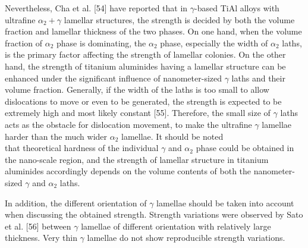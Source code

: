 \documentclass[10pt]{article}
\begin{document}
Nevertheless, Cha et al. [54] have reported that in $\gamma$-based TiAl alloys with ultrafine $\alpha_{2}+\gamma$ lamellar structures, the strength is decided by both the volume fraction and lamellar thickness of the two phases. On one hand, when the volume fraction of $\alpha_{2}$ phase is dominating, the $\alpha_{2}$ phase, especially the width of $\alpha_{2}$ laths, is the primary factor affecting the strength of lamellar colonies. On the other hand, the strength of titanium aluminides having a lamellar structure can be enhanced under the significant influence of nanometer-sized $\gamma$ laths and their volume fraction. Generally, if the width of the laths is too small to allow dislocations to move or even to be generated, the strength is expected to be extremely high and most likely constant [55]. Therefore, the small size of $\gamma$ laths acts as the obstacle for dislocation movement, to make the ultrafine $\gamma$ lamellae harder than the much wider $\alpha_{2}$ lamellae. It should be noted\\
that theoretical hardness of the individual $\gamma$ and $\alpha_{2}$ phase could be obtained in the nano-scale region, and the strength of lamellar structure in titanium aluminides accordingly depends on the volume contents of both the nanometer-sized $\gamma$ and $\alpha_{2}$ laths.

In addition, the different orientation of $\gamma$ lamellae should be taken into account when discussing the obtained strength. Strength variations were observed by Sato et al. [56] between $\gamma$ lamellae of different orientation with relatively large thickness. Very thin $\gamma$ lamellae do not show reproducible strength variations.
\end{document}
